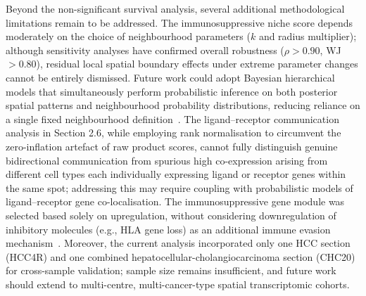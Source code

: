 \documentclass[12pt, a4paper]{article}
\begin{document}
Beyond the non-significant survival analysis, several additional methodological limitations remain to be addressed. The immunosuppressive niche score depends moderately on the choice of neighbourhood parameters ($k$ and radius multiplier); although sensitivity analyses have confirmed overall robustness ($\rho > 0.90$, WJ $> 0.80$), residual local spatial boundary effects under extreme parameter changes cannot be entirely dismissed. Future work could adopt Bayesian hierarchical models that simultaneously perform probabilistic inference on both posterior spatial patterns and neighbourhood probability distributions, reducing reliance on a single fixed neighbourhood definition~\citep{kleshchevnikov2022cell2location}. The ligand--receptor communication analysis in Section 2.6, while employing rank normalisation to circumvent the zero-inflation artefact of raw product scores, cannot fully distinguish genuine bidirectional communication from spurious high co-expression arising from different cell types each individually expressing ligand or receptor genes within the same spot; addressing this may require coupling with probabilistic models of ligand--receptor gene co-localisation. The immunosuppressive gene module was selected based solely on upregulation, without considering downregulation of inhibitory molecules (e.g., HLA gene loss) as an additional immune evasion mechanism~\citep{montesion2021hla}. Moreover, the current analysis incorporated only one HCC section (HCC4R) and one combined hepatocellular-cholangiocarcinoma section (CHC20) for cross-sample validation; sample size remains insufficient, and future work should extend to multi-centre, multi-cancer-type spatial transcriptomic cohorts.
\end{document}
